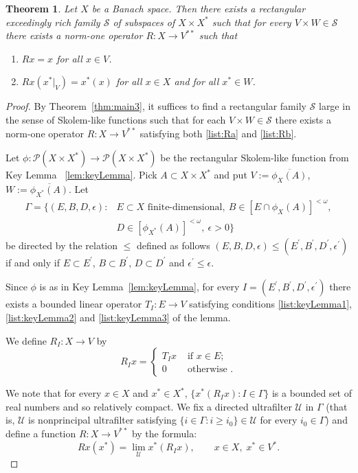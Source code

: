 \documentclass[11pt]{amsart}
\newtheorem{thm}{Theorem}
\theoremstyle{definition}
\theoremstyle{remark}
\newcommand{\U}{\mathcal U}
\newcommand{\PP}{\mathcal P}
\newcommand{\SSS}{\mathcal S}
\begin{document}
\begin{thm}\label{thm:richAiIdeals}Let $X$ be a Banach space. Then there exists a rectangular exceedingly rich family $\SSS$ of subspaces of $X\times X^*$ such that for every $V\times W\in \SSS$ there exists a norm-one operator $R:X\to V^{**}$ such that 
\begin{enumerate}[label=\textnormal{(R\alph*)}]
\item\label{list:Ra} $Rx=x$ for all $x\in V$. 
\item\label{list:Rb} $Rx(x^*|_{V})= x^*(x)$ for all $x\in X$ and for all $x^{*}\in W$.
\end{enumerate}
\end{thm}
\begin{proof}
By Theorem~\ref{thm:main3}, it suffices to find a rectangular family $\SSS$ large in the sense of Skolem-like functions such that for each $V\times W\in \SSS$ there exists a norm-one operator $R:X\to V^{**}$ satisfying both \ref{list:Ra} and \ref{list:Rb}.

Let $\phi:\PP(X\times X^*)\to \PP(X\times X^*)$ be the rectangular Skolem-like function from Key Lemma ~\ref{lem:keyLemma}. Pick $A\subset X\times X^*$ and put $V:=\overline{\phi_X(A)}$, $W:=\overline{\phi_{X^*}(A)}$. Let 
\[\begin{split}
\varGamma=\{(E,B,D,\epsilon)\colon & E\subset X \text{ finite-dimensional},\ B\in [E\cap \phi_X(A)]^{<\omega},\\
 & D\in [\phi_{X^*}(A)]^{<\omega}, \ \epsilon>0\}
\end{split}\]
be directed by the relation $\leq$ defined as follows 
$(E,B,D,\epsilon)\leq (E^\prime,B^\prime,D^\prime,\epsilon^\prime)$ if and only if $E\subset E^\prime$, $B\subset B^\prime$, $D\subset D^\prime$ and $\epsilon^\prime \leq \epsilon$.

Since $\phi$ is as in Key Lemma~\ref{lem:keyLemma}, for every $I=(E^\prime,B^\prime,D^\prime,\epsilon^\prime)$ there exists a bounded linear operator
$T_I:E\to V$ satisfying conditions \ref{list:keyLemma1}, \ref{list:keyLemma2} and \ref{list:keyLemma3} of the lemma.

We define $R_I:X\to V$ by 
\begin{displaymath}
R_Ix= \left\{
\begin{array}{ll}
T_Ix & \text{ if }x\in E;\\
0 & \text{ otherwise }.
\end{array} \right.
\end{displaymath}
 
We note that for every $x\in X$ and $x^*\in X^*$, $\{x^*(R_Ix):I\in \varGamma\}$ is a bounded set of real numbers and so relatively compact. We fix a directed ultrafilter $\mathcal{U}$ in $\varGamma$ (that is, $\U$ is nonprincipal ultrafilter satisfying $\{i\in\Gamma\colon i\geq i_0\}\in \U$ for every $i_0\in\Gamma$) and define a function $R:X\to V^{**}$ by the formula:
\[Rx(x^*)=\lim_{\mathcal{U}}x^*(R_Ix),\qquad x\in X,\; x^*\in V^*.\]


\end{proof}
\end{document}
